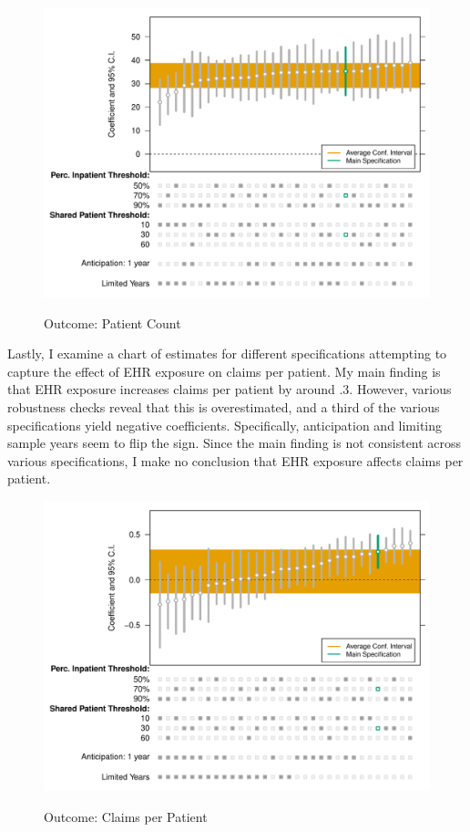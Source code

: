 \documentclass[12pt]{article}
\begin{document}
\begin{figure}[ht]
    \caption{Outcome: Patient Count}
    \includegraphics[scale=.7]{Objects/patient_chart.pdf}
    \label{fig:pat_chart}
\end{figure}

Lastly, I examine a chart of estimates for different specifications attempting to capture the effect of EHR exposure on claims per patient. My main finding is that EHR exposure increases claims per patient by around .3. However, various robustness checks reveal that this is overestimated, and a third of the various specifications yield negative coefficients. Specifically, anticipation and limiting sample years seem to flip the sign. Since the main finding is not consistent across various specifications, I make no conclusion that EHR exposure affects claims per patient. 

\begin{figure}[ht]
    \caption{Outcome: Claims per Patient}
    \includegraphics[scale=.7]{Objects/claim_chart.pdf}
    \label{fig:cpp_chart}
\end{figure}
\end{document}
